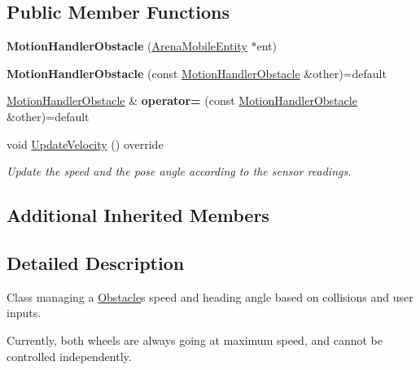\subsection*{Public Member Functions}
\begin{DoxyCompactItemize}
\item 
{\bfseries Motion\+Handler\+Obstacle} (\hyperlink{classArenaMobileEntity}{Arena\+Mobile\+Entity} $\ast$ent)\hypertarget{classMotionHandlerObstacle_a372bbd2b587c47fd3535d7044a8e8938}{}\label{classMotionHandlerObstacle_a372bbd2b587c47fd3535d7044a8e8938}

\item 
{\bfseries Motion\+Handler\+Obstacle} (const \hyperlink{classMotionHandlerObstacle}{Motion\+Handler\+Obstacle} \&other)=default\hypertarget{classMotionHandlerObstacle_a4454a8e05721c4b0aabc263961ae5f8a}{}\label{classMotionHandlerObstacle_a4454a8e05721c4b0aabc263961ae5f8a}

\item 
\hyperlink{classMotionHandlerObstacle}{Motion\+Handler\+Obstacle} \& {\bfseries operator=} (const \hyperlink{classMotionHandlerObstacle}{Motion\+Handler\+Obstacle} \&other)=default\hypertarget{classMotionHandlerObstacle_a6678c9e294e30b6f932fa49919fe27ff}{}\label{classMotionHandlerObstacle_a6678c9e294e30b6f932fa49919fe27ff}

\item 
void \hyperlink{classMotionHandlerObstacle_ad41e6be12c163937f5ccab36c4e35be8}{Update\+Velocity} () override
\begin{DoxyCompactList}\small\item\em Update the speed and the pose angle according to the sensor readings. \end{DoxyCompactList}\end{DoxyCompactItemize}
\subsection*{Additional Inherited Members}


\subsection{Detailed Description}
Class managing a \hyperlink{classObstacle}{Obstacle}\textquotesingle{}s speed and heading angle based on collisions and user inputs. 

Currently, both wheels are always going at maximum speed, and cannot be controlled independently. 

